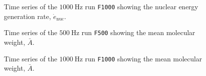 \documentclass[preprint,times,tighten]{aastex63}
\begin{document}
\begin{figure}[t]
\centering
{}
\caption{\label{fig:time_series_enuc_1000} Time series of the $1000~\mathrm{Hz}$ run {\tt F1000} showing the nuclear energy generation rate, $\dot{e}_\mathrm{nuc}$.}
\end{figure}

\begin{figure}[t]
\centering
{}
\caption{\label{fig:time_series_500} Time series of the $500~\mathrm{Hz}$ run {\tt F500} showing the mean molecular weight, $\bar{A}$.}
\end{figure}


\begin{figure}[t]
\centering
{}
\caption{\label{fig:time_series_1000} Time series of the $1000~\mathrm{Hz}$ run {\tt F1000} showing the mean molecular weight, $\bar{A}$.}
\end{figure}
\end{document}

